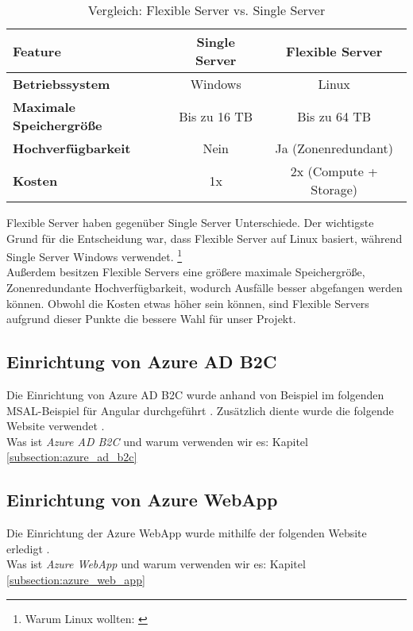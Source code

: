 \begin{table}[h t]
    \centering
    \caption{Vergleich: Flexible Server vs. Single Server}
    \label{tab:azure-postgresql}
    \begin{tabular}{lcc}
    \hline
    \textbf{Feature}                & \textbf{Single Server} & \textbf{Flexible Server} \\ \hline
    \textbf{Betriebssystem}         & Windows                & Linux                    \\
    \textbf{Maximale Speichergrö\ss{}e} & Bis zu 16 TB           & Bis zu 64 TB             \\
    \textbf{Hochverfügbarkeit}      & Nein                   & Ja (Zonenredundant)      \\
    \textbf{Kosten}                 & 1x                     & 2x (Compute + Storage)   \\ \hline
    \end{tabular}
\end{table}

Flexible Server haben gegenüber Single Server Unterschiede. 
Der wichtigste Grund für die Entscheidung war, dass Flexible Server auf Linux basiert, 
während Single Server Windows verwendet. \footnote{Warum Linux wollten: \cite{hussain2015survey}}
\\
Au\ss{}erdem besitzen Flexible Servers eine grö\ss{}ere maximale Speichergrö\ss{}e, Zonenredundante Hochverfügbarkeit, 
wodurch Ausfälle besser abgefangen werden können. Obwohl die Kosten etwas höher sein können, 
sind Flexible Servers aufgrund dieser Punkte die bessere Wahl für unser Projekt.

\subsection{Einrichtung von Azure AD B2C}

Die Einrichtung von Azure AD B2C wurde anhand von Beispiel im folgenden MSAL-Beispiel
für Angular durchgeführt \cite{MicrosoftCorporationh}. Zusätzlich diente wurde die folgende
Website verwendet \cite{MicrosoftCorporationg}.
\\
Was ist \emph{Azure AD B2C} und warum verwenden wir es: Kapitel \ref{subsection:azure_ad_b2c}

\subsection{Einrichtung von Azure WebApp}

Die Einrichtung der Azure WebApp wurde mithilfe der folgenden Website erledigt 
\cite{MicrosoftCorporationi}.
\\
Was ist \emph{Azure WebApp} und warum verwenden wir es: Kapitel \ref{subsection:azure_web_app}


